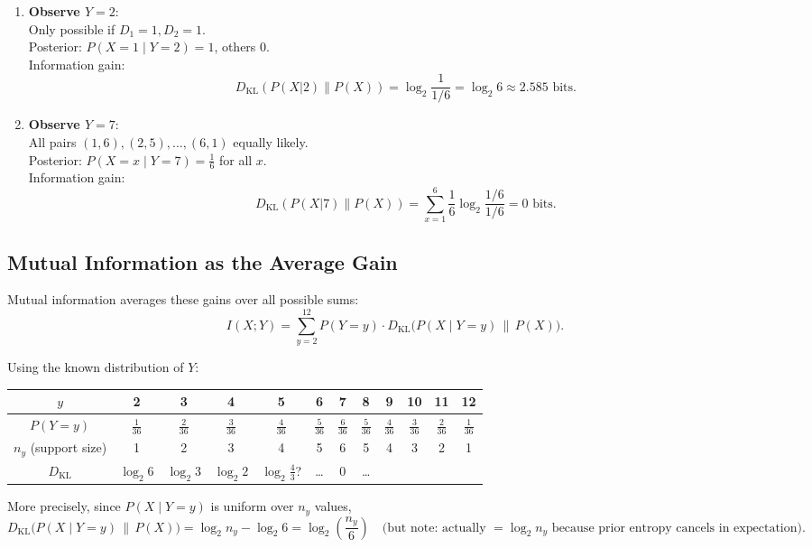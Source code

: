 \documentclass[11pt]{article}
\begin{document}
\begin{enumerate}
    \item \textbf{Observe \(Y = 2\)}: \\
    Only possible if \(D_1 = 1, D_2 = 1\). \\
    Posterior: \(P(X = 1 \mid Y = 2) = 1\), others 0. \\
    Information gain:
    \[
    D_{\mathrm{KL}}(P(X|2) \| P(X)) = \log_2 \frac{1}{1/6} = \log_2 6 \approx 2.585 \text{ bits}.
    \]

    \item \textbf{Observe \(Y = 7\)}: \\
    All pairs \((1,6), (2,5), \dots, (6,1)\) equally likely. \\
    Posterior: \(P(X = x \mid Y = 7) = \frac{1}{6}\) for all \(x\). \\
    Information gain:
    \[
    D_{\mathrm{KL}}(P(X|7) \| P(X)) = \sum_{x=1}^6 \frac{1}{6} \log_2 \frac{1/6}{1/6} = 0 \text{ bits}.
    \]
\end{enumerate}

\subsection*{Mutual Information as the Average Gain}

Mutual information averages these gains over all possible sums:
\[
I(X;Y) = \sum_{y=2}^{12} P(Y = y) \cdot D_{\mathrm{KL}}\big(P(X \mid Y = y) \,\|\, P(X)\big).
\]

Using the known distribution of \(Y\):
\begin{center}
\begin{tabular}{c|ccccccccccc}
\(y\) & 2 & 3 & 4 & 5 & 6 & 7 & 8 & 9 & 10 & 11 & 12 \\
\midrule
\(P(Y=y)\) & \(\frac{1}{36}\) & \(\frac{2}{36}\) & \(\frac{3}{36}\) & \(\frac{4}{36}\) & \(\frac{5}{36}\) & \(\frac{6}{36}\) & \(\frac{5}{36}\) & \(\frac{4}{36}\) & \(\frac{3}{36}\) & \(\frac{2}{36}\) & \(\frac{1}{36}\) \\
\(n_y\) (support size) & 1 & 2 & 3 & 4 & 5 & 6 & 5 & 4 & 3 & 2 & 1 \\
\(D_{\mathrm{KL}}\) & \(\log_2 6\) & \(\log_2 3\) & \(\log_2 2\) & \(\log_2 \tfrac{4}{3}\)? & \dots & 0 & \dots & & & &
\end{tabular}
\end{center}

More precisely, since \(P(X \mid Y = y)\) is uniform over \(n_y\) values,
\[
D_{\mathrm{KL}}\big(P(X \mid Y = y) \,\|\, P(X)\big) = \log_2 n_y - \log_2 6 = \log_2 \left( \frac{n_y}{6} \right) \quad \text{(but note: actually } = \log_2 n_y \text{ because prior entropy cancels in expectation)}.
\]
\end{document}
